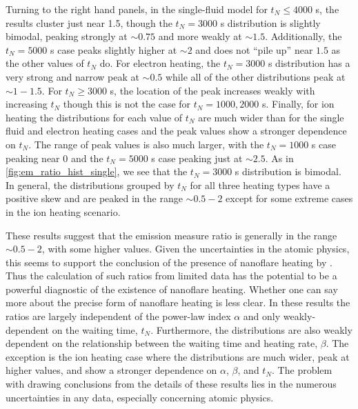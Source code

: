 \documentclass[preprint]{aastex}
\begin{document}
%
	\par Turning to the right hand panels, in the single-fluid model for $t_N\le4000$ s, the results cluster just near 1.5, though the $t_N=3000$ s distribution is slightly bimodal, peaking strongly at $\sim0.75$ and more weakly at $\sim1.5$. Additionally, the $t_N=5000$ s case peaks slightly higher at $\sim2$ and does not ``pile up'' near $1.5$ as the other values of $t_N$ do. For electron heating, the $t_N=3000$ s distribution has a very strong and narrow peak at $\sim0.5$ while all of the other distributions peak at $\sim1-1.5$. For $t_N\ge3000$ s, the location of the peak increases weakly with increasing $t_N$ though this is not the case for $t_N=1000,2000$ s. Finally, for ion heating the distributions for each value of $t_N$ are much wider than for the single fluid and electron heating cases and the peak values show a stronger dependence on $t_N$. The range of peak values is also much larger, with the $t_N=1000$ s case peaking near 0 and the $t_N=5000$ s case peaking just at $\sim2.5$. As in \autoref{fig:em_ratio_hist_single}, we see that the $t_N=3000$ s distribution is bimodal. In general, the distributions grouped by $t_N$ for all three heating types have a positive skew and are peaked in the range $\sim0.5-2$ except for some extreme cases in the ion heating scenario.
	\par These results suggest that the emission measure ratio is generally in the range $\sim0.5-2$, with some higher values. Given the uncertainties in the atomic physics, this seems to support the conclusion of the presence of nanoflare heating by \citet{brosius_pervasive_2014}. Thus the calculation of such ratios from limited data has the potential to be a powerful diagnostic of the existence of nanoflare heating. Whether one can say more about the precise form of nanoflare heating is less clear. In these results the ratios are largely independent of the power-law index $\alpha$ and only weakly-dependent on the waiting time, $t_N$. Furthermore, the distributions are also weakly dependent on the relationship between the waiting time and heating rate, $\beta$. The exception is the ion heating case where the distributions are much wider, peak at higher values, and show a stronger dependence on $\alpha$, $\beta$, and $t_N$. The problem with drawing conclusions from the details of these results lies in the numerous uncertainties in any data, especially concerning atomic physics.
\end{document}

